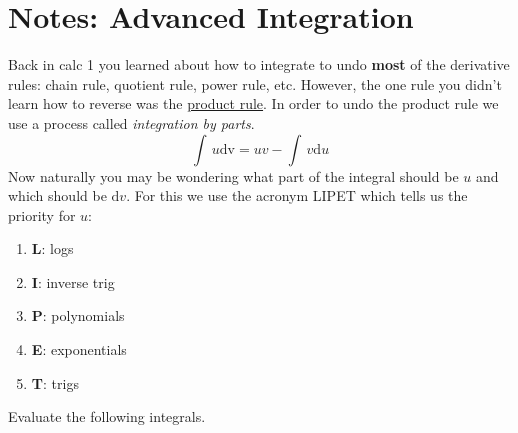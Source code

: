 \documentclass[addpoints]{exam}
\theoremstyle{definition}
\theoremstyle{plain}
\begin{document}
\section{Notes: Advanced Integration}
\begin{tcolorbox}[breakable, title=\subsection{Integration By Parts}, colframe=black, sharp corners, colback=Azure4!70, colbacktitle=DodgerBlue3!60, coltitle=black]
    Back in calc 1 you learned about how to integrate to undo \textbf{most} of the derivative rules: chain rule, quotient rule, power rule, etc. However, the one rule you didn't learn how to reverse was the \underline{product rule}. In order to undo the product rule we use a process called \emph{integration by parts}. 
    \[
        \int\,u\mathrm{dv} = uv - \int\,v\mathrm{d}u
    \]
    Now naturally you may be wondering what part of the integral should be $u$ and which should be $\mathrm{d}v$. For this we use the acronym LIPET which tells us the priority for $u$:
    \begin{enumerate}
        \item \textbf{L}: logs 
        \item \textbf{I}: inverse trig
        \item \textbf{P}: polynomials
        \item \textbf{E}: exponentials
        \item \textbf{T}: trigs
    \end{enumerate}
\end{tcolorbox}
Evaluate the following integrals.
\end{document}
